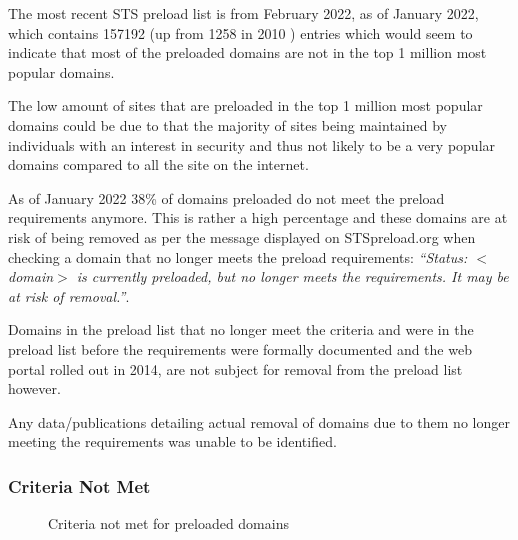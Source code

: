 \documentclass{mscreport}
\begin{document}
\vspace{0.3cm} \noindent
The most recent STS preload list is from February 2022, as of January 2022, which contains 157192 (up from 1258 in 2010 \cite{Michael2015-hn}) entries which would seem to indicate that most of the preloaded domains are not in the top 1 million most popular domains.

\vspace{0.3cm} \noindent
The low amount of sites that are preloaded in the top 1 million most popular domains could be due to that the majority of sites being maintained by individuals with an interest in security and thus not likely to be a very popular domains compared to all the site on the internet.

\vspace{0.3cm} \noindent
As of January 2022 38\% of domains preloaded do not meet the preload requirements anymore. This is rather a high percentage and these domains are at risk of being removed as per the message displayed on STSpreload.org when checking a domain that no longer meets the preload requirements: \textit{``Status: $<$domain$>$ is currently preloaded, but no longer meets the requirements. It may be at risk of removal.''}.

\vspace{0.3cm} \noindent
Domains in the preload list that no longer meet the criteria and were in the preload list before the requirements were formally documented and the web portal rolled out in 2014, are not subject for removal from the preload list however.

\vspace{0.3cm} \noindent
Any data/publications detailing actual removal of domains due to them no longer meeting the requirements was unable to be identified.

\subsubsection{Criteria Not Met}

\begin{figure}[t]
	\begin{center}
		\caption{Criteria not met for preloaded domains}
		\label{fig:STS_preloaded_criteria_not_met}
	\end{center}
\end{figure}

\end{document}
